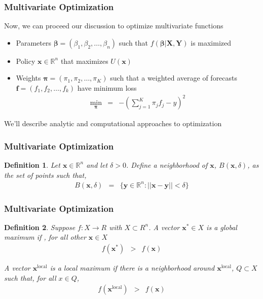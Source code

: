 \documentclass[handout]{beamer}
\newtheorem{defn}{Definition}
\numberwithin{equation}{section}
\begin{document}
\begin{frame}
\frametitle{Multivariate Optimization}

Now, we can proceed our discussion to optimize multivariate functions \pause
\begin{itemize}
\item[-] Parameters $\boldsymbol{\beta} = (\beta_{1}, \beta_{2}, \hdots, \beta_{n} ) $ such that $f(\boldsymbol{\beta}| \boldsymbol{X}, \boldsymbol{Y})$ is maximized
\item[-] Policy $\boldsymbol{x} \in \mathbb{R}^{n}$ that maximizes $U(\boldsymbol{x})$
\item[-] Weights $\boldsymbol{\pi} = (\pi_{1}, \pi_{2}, \hdots, \pi_{K})$ such that a weighted average of forecasts $\boldsymbol{f}  =  (f_{1} , f_{2}, \hdots, f_{k})$ have minimum loss 
\begin{eqnarray}
\min_{\boldsymbol{\pi}} & = & - (\sum_{j=1}^{K} \pi_{j} f_{j}  - y ) ^ 2 \nonumber 
\end{eqnarray} 
\end{itemize} \pause

We'll describe analytic and computational approaches to optimization

\end{frame}




\begin{frame}
\frametitle{Multivariate Optimization}

\begin{defn} 
Let $\boldsymbol{x} \in \mathbb{R}^{n}$ and let $\delta >0$.  Define a \alert{neighborhood} of $\boldsymbol{x}$, $B(\boldsymbol{x}, \delta)$, as the set of points such that, 
\begin{eqnarray}
B(\boldsymbol{x}, \delta) & = & \{ \boldsymbol{y} \in \mathbb{R}^{n} : ||\boldsymbol{x} - \boldsymbol{y}||< \delta \}  \nonumber 
\end{eqnarray}
\end{defn}

\end{frame}



\begin{frame}
\frametitle{Multivariate Optimization}


\begin{defn} Suppose $f:X \rightarrow R$ with $X \subset R^{n}$.  A vector $\boldsymbol{x}^{*} \in X$ is a \alert{global maximum} if , for all other $\boldsymbol{x} \in X$ 
\begin{eqnarray}
f(\boldsymbol{x}^{*}) & > & f(\boldsymbol{x} ) \nonumber 
\end{eqnarray}

A vector $\boldsymbol{x}^{\text{local}}$ is a \alert{local} maximum if there is a neighborhood around $\boldsymbol{x}^{\text{local}}$, $Q \subset X$ such that, for all $x \in Q$, 
\begin{eqnarray}
f(\boldsymbol{x}^{\text{local} }) & > & f(\boldsymbol{x} ) \nonumber 
\end{eqnarray}
\end{defn}

\end{frame}
\end{document}
